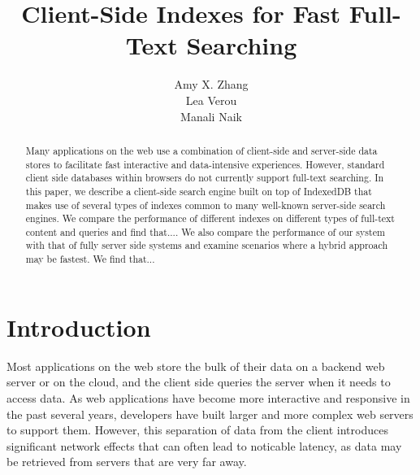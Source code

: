 \documentclass{vldb}
\begin{document}

\title{Client-Side Indexes for Fast Full-Text Searching}




\author{
\alignauthor
Amy X. Zhang\\
\alignauthor Lea Verou\\
\alignauthor Manali Naik\\
}

\maketitle

\begin{abstract}

Many applications on the web use a combination of client-side and server-side data stores to facilitate fast interactive and data-intensive experiences. 
However, standard client side databases within browsers do not currently support full-text searching. 
In this paper, we describe a client-side search engine built on top of IndexedDB that makes use of several types of indexes common to many well-known server-side search engines.
We compare the performance of different indexes on different types of full-text content and queries and find that....
We also compare the performance of our system with that of fully server side systems and examine scenarios where a hybrid approach may be fastest. We find that...

\end{abstract}

\section{Introduction}

Most applications on the web store the bulk of their data on a backend web server or on the cloud, and the client side queries the server when it needs to access data.
As web applications have become more interactive and responsive in the past several years, developers have built larger and more complex web servers to support them. However, this separation of data from the client introduces significant network effects that can often lead to noticable latency, as data may be retrieved from servers that are very far away. 
\end{document}
